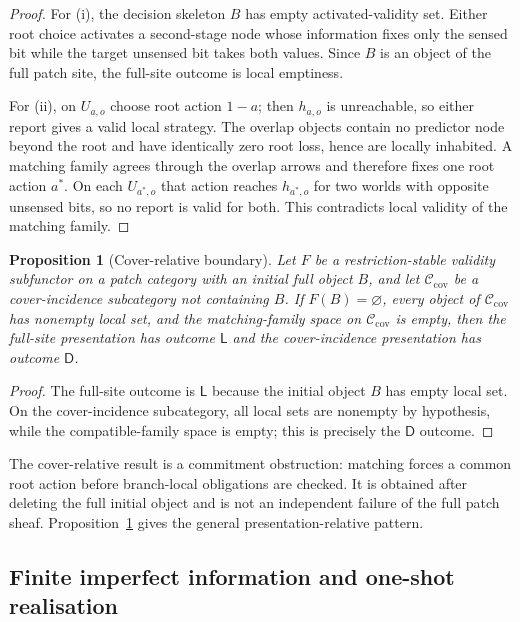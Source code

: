 \documentclass[11pt]{article}
\theoremstyle{plain}
\newtheorem{proposition}[theorem]{Proposition}
\theoremstyle{definition}
\theoremstyle{remark}
\begin{document}
\begin{proof}
For (i), the decision skeleton $B$ has empty activated-validity set. Either root
choice activates a second-stage node whose information fixes only the sensed bit
while the target unsensed bit takes both values. Since $B$ is an object of the
full patch site, the full-site outcome is local emptiness.

For (ii), on $U_{a,o}$ choose root action $1-a$; then $h_{a,o}$ is unreachable,
so either report gives a valid local strategy. The overlap objects contain no
predictor node beyond the root and have identically zero root loss, hence are
locally inhabited. A matching family agrees through the overlap arrows and
therefore fixes one root action $a^*$. On each $U_{a^*,o}$ that action reaches
$h_{a^*,o}$ for two worlds with opposite unsensed bits, so no report is valid for
both. This contradicts local validity of the matching family.
\end{proof}

\begin{proposition}[Cover-relative boundary]
\label{prop:cover-boundary}
Let $F$ be a restriction-stable validity subfunctor on a patch category with an
initial full object $B$, and let $\mathcal C_{\mathrm{cov}}$ be a cover-incidence
subcategory not containing $B$. If $F(B)=\varnothing$, every object of
$\mathcal C_{\mathrm{cov}}$ has nonempty local set, and the matching-family space
on $\mathcal C_{\mathrm{cov}}$ is empty, then the full-site presentation has
outcome $\mathsf L$ and the cover-incidence presentation has outcome
$\mathsf D$.
\end{proposition}

\begin{proof}
The full-site outcome is $\mathsf L$ because the initial object $B$ has empty
local set. On the cover-incidence subcategory, all local sets are nonempty by
hypothesis, while the compatible-family space is empty; this is precisely the
$\mathsf D$ outcome.
\end{proof}

The cover-relative result is a commitment obstruction: matching forces a common
root action before branch-local obligations are checked. It is obtained after
deleting the full initial object and is not an independent failure of the full
patch sheaf. Proposition~\ref{prop:cover-boundary} gives the general
presentation-relative pattern.

\subsection{Finite imperfect information and one-shot realisation}
\label{subsec:oneshot}
\end{document}
